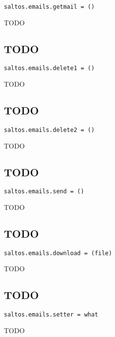 \documentclass[a4paper]{book}
\begin{document}
\begin{lstlisting}
saltos.emails.getmail = ()
\end{lstlisting}

TODO

\hypertarget{toc23}{}
\subsection{TODO}

\begin{lstlisting}
saltos.emails.delete1 = ()
\end{lstlisting}

TODO

\hypertarget{toc24}{}
\subsection{TODO}

\begin{lstlisting}
saltos.emails.delete2 = ()
\end{lstlisting}

TODO

\hypertarget{toc25}{}
\subsection{TODO}

\begin{lstlisting}
saltos.emails.send = ()
\end{lstlisting}

TODO

\hypertarget{toc26}{}
\subsection{TODO}

\begin{lstlisting}
saltos.emails.download = (file)
\end{lstlisting}

TODO

\hypertarget{toc27}{}
\subsection{TODO}

\begin{lstlisting}
saltos.emails.setter = what
\end{lstlisting}

TODO


\hypertarget{toc28}{}
\end{document}
